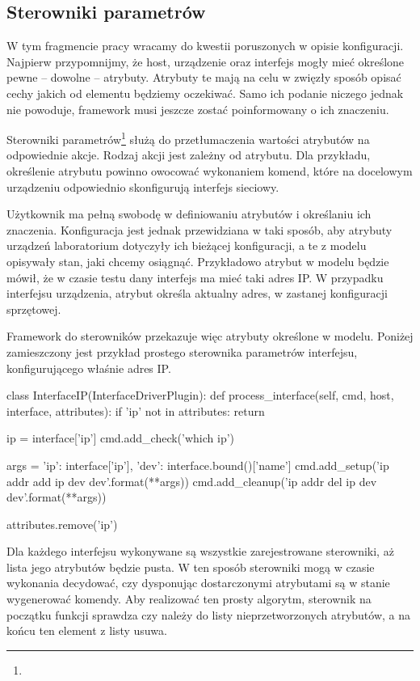 \documentclass[00-praca-magisterska.tex]{subfiles}
\begin{document}
\subsection{Sterowniki parametrów}

W tym fragmencie pracy wracamy do kwestii poruszonych w opisie konfiguracji.
Najpierw przypomnijmy, że host, urządzenie oraz interfejs mogły mieć określone
pewne -- dowolne -- atrybuty. Atrybuty te mają na celu w zwięzły sposób opisać
cechy jakich od elementu będziemy oczekiwać. Samo ich podanie niczego jednak nie
powoduje, framework musi jeszcze zostać poinformowany o ich znaczeniu.

Sterowniki parametrów\footnote{} służą do przetłumaczenia
wartości atrybutów na odpowiednie akcje. Rodzaj akcji jest zależny od atrybutu.
Dla przykładu, określenie atrybutu  powinno owocować wykonaniem komend,
które na docelowym urządzeniu odpowiednio skonfigurują interfejs sieciowy.

Użytkownik ma pełną swobodę w definiowaniu atrybutów i określaniu ich
znaczenia. Konfiguracja jest jednak przewidziana w taki sposób, aby atrybuty
urządzeń laboratorium dotyczyły ich bieżącej konfiguracji, a te z modelu
opisywały stan, jaki chcemy osiągnąć. Przykładowo atrybut  w modelu
będzie mówił, że w czasie testu dany interfejs ma mieć taki adres IP. W
przypadku interfejsu urządzenia, atrybut  określa aktualny adres, w
zastanej konfiguracji sprzętowej.

Framework do sterowników przekazuje więc atrybuty określone w modelu. Poniżej
zamieszczony jest przykład prostego sterownika parametrów interfejsu,
konfigurującego właśnie adres IP.

\begin{pythoncode}
  class InterfaceIP(InterfaceDriverPlugin):
      def process_interface(self, cmd, host, interface, attributes):
          if 'ip' not in attributes:
              return
  
          ip = interface['ip']
          cmd.add_check('which ip')
  
          args = {'ip': interface['ip'],
                  'dev': interface.bound()['name']}
          cmd.add_setup('ip addr add {ip} dev {dev}'.format(**args))
          cmd.add_cleanup('ip addr del {ip} dev {dev}'.format(**args))
  
          attributes.remove('ip')

\end{pythoncode}

Dla każdego interfejsu wykonywane są wszystkie zarejestrowane sterowniki, aż
lista jego atrybutów będzie pusta. W ten sposób sterowniki mogą w czasie
wykonania decydować, czy dysponując dostarczonymi atrybutami są w stanie
wygenerować komendy. Aby realizować ten prosty algorytm, sterownik na początku
funkcji  sprawdza czy  należy do listy
nieprzetworzonych atrybutów, a na końcu ten element z listy usuwa.
\end{document}
